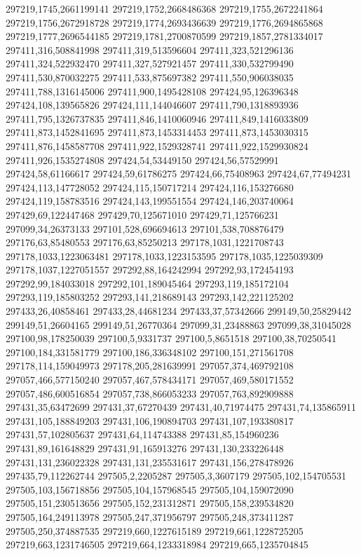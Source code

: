 297219,1745,2661199141
297219,1752,2668486368
297219,1755,2672241864
297219,1756,2672918728
297219,1774,2693436639
297219,1776,2694865868
297219,1777,2696544185
297219,1781,2700870599
297219,1857,2781334017
297411,316,508841998
297411,319,513596604
297411,323,521296136
297411,324,522932470
297411,327,527921457
297411,330,532799490
297411,530,870032275
297411,533,875697382
297411,550,906038035
297411,788,1316145006
297411,900,1495428108
297424,95,126396348
297424,108,139565826
297424,111,144046607
297411,790,1318893936
297411,795,1326737835
297411,846,1410060946
297411,849,1416033809
297411,873,1452841695
297411,873,1453314453
297411,873,1453030315
297411,876,1458587708
297411,922,1529328741
297411,922,1529930824
297411,926,1535274808
297424,54,53449150
297424,56,57529991
297424,58,61166617
297424,59,61786275
297424,66,75408963
297424,67,77494231
297424,113,147728052
297424,115,150717214
297424,116,153276680
297424,119,158783516
297424,143,199551554
297424,146,203740064
297429,69,122447468
297429,70,125671010
297429,71,125766231
297099,34,26373133
297101,528,696694613
297101,538,708876479
297176,63,85480553
297176,63,85250213
297178,1031,1221708743
297178,1033,1223063481
297178,1033,1223153595
297178,1035,1225039309
297178,1037,1227051557
297292,88,164242994
297292,93,172454193
297292,99,184033018
297292,101,189045464
297293,119,185172104
297293,119,185803252
297293,141,218689143
297293,142,221125202
297433,26,40858461
297433,28,44681234
297433,37,57342666
299149,50,25829442
299149,51,26604165
299149,51,26770364
297099,31,23488863
297099,38,31045028
297100,98,178250039
297100,5,9331737
297100,5,8651518
297100,38,70250541
297100,184,331581779
297100,186,336348102
297100,151,271561708
297178,114,159049973
297178,205,281639991
297057,374,469792108
297057,466,577150240
297057,467,578434171
297057,469,580171552
297057,486,600516854
297057,738,866053233
297057,763,892909888
297431,35,63472699
297431,37,67270439
297431,40,71974475
297431,74,135865911
297431,105,188849203
297431,106,190894703
297431,107,193380817
297431,57,102805637
297431,64,114743388
297431,85,154960236
297431,89,161648829
297431,91,165913276
297431,130,233226448
297431,131,236022328
297431,131,235531617
297431,156,278478926
297435,79,112262744
297505,2,2205287
297505,3,3607179
297505,102,154705531
297505,103,156718856
297505,104,157968545
297505,104,159072090
297505,151,230513656
297505,152,231312871
297505,158,239534820
297505,164,249113978
297505,247,371956797
297505,248,373411287
297505,250,374887535
297219,660,1227615189
297219,661,1228725205
297219,663,1231746505
297219,664,1233318984
297219,665,1235704845
